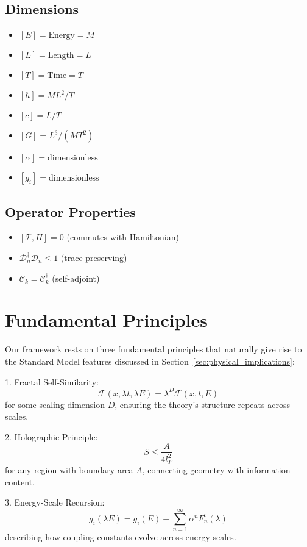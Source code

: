 \documentclass[12pt]{article}
\begin{document}
\subsection{Dimensions}
\begin{itemize}
  \item $[E] = \text{Energy} = M$
  \item $[L] = \text{Length} = L$
  \item $[T] = \text{Time} = T$
  \item $[\hbar] = ML^2/T$
  \item $[c] = L/T$
  \item $[G] = L^3/(MT^2)$
  \item $[\alpha] = \text{dimensionless}$
  \item $[g_i] = \text{dimensionless}$
\end{itemize}

\subsection{Operator Properties}
\begin{itemize}
  \item $[\mathcal{T}, H] = 0$ (commutes with Hamiltonian)
  \item $\mathcal{D}_n^\dagger \mathcal{D}_n \leq 1$ (trace-preserving)
  \item $\mathcal{C}_k = \mathcal{C}_k^\dagger$ (self-adjoint)
\end{itemize}

\section{Fundamental Principles}

Our framework rests on three fundamental principles that naturally give rise to the Standard Model features discussed in Section~\ref{sec:physical_implications}:

1. Fractal Self-Similarity:
   \[
   \mathcal{F}(x, \lambda t, \lambda E) = \lambda^D \mathcal{F}(x, t, E)
   \]
   for some scaling dimension $D$, ensuring the theory's structure repeats across scales.

2. Holographic Principle:
   \[
   S \leq \frac{A}{4l_P^2}
   \]
   for any region with boundary area $A$, connecting geometry with information content.

3. Energy-Scale Recursion:
   \[
   g_i(\lambda E) = g_i(E) + \sum_{n=1}^{\infty} \alpha^n F_n^i(\lambda)
   \]
   describing how coupling constants evolve across energy scales.
\end{document}
